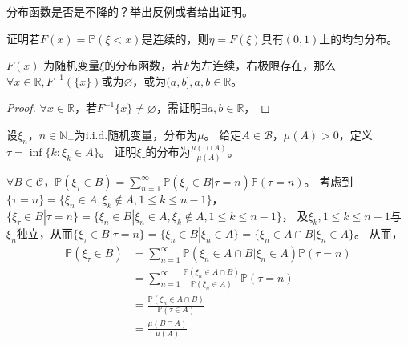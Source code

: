 \documentclass{ctexart}
\newif\ifpreface
\begin{document}
\large
\setlength{\baselineskip}{1.2em}
\ifpreface

\newgeometry{left=2cm,right=2cm,top=2cm,bottom=2cm}
\else
{}
\maketitle
\fi
\begin{problem}\label{pro:5}
  分布函数是否是不降的？举出反例或者给出证明。
\end{problem}

\begin{problem}\label{pro:7}
  证明若\(F(x)=\mathbb{P}(\xi < x) \)是连续的，则\(\eta = F(\xi) \)具有\((0,1) \)上的均匀分布。
\end{problem}
\begin{solution}
 \begin{lemma}\label{lem:pro7}
   \(F(x) \) 为随机变量\(\xi \)的分布函数，若\(F \)为左连续，右极限存在，那么\(\forall x \in \mathbb{R}, F^{-1}(\{x\}) \)或为\(\varnothing \)，或为\((a,b],a,b \in \mathbb{R} \)。
 \end{lemma}
\begin{proof}
 \(\forall x \in \mathbb{R} \)，若\(F^{-1}\{x\} \neq \varnothing\)，需证明\(\exists a, b \in \mathbb{R} \)， 
\end{proof}
  
\end{solution}

\begin{problem}\label{pro:9}
  设\(\xi_n，n \in \mathbb{N}_{+} \)为\(\mathrm{i.i.d.}  \)随机变量，分布为\(\mu \)。
  给定\(A \in \mathcal{B} \)，\(\mu(A) >0 \)，定义\(\tau = \inf\{k:\xi_k \in A\} \)。
  证明\(\xi_{\tau} \)的分布为\(\frac{\mu(\cdot \cap A)}{\mu(A)} \)。
\end{problem}
\begin{solution}
  \(\forall B \in \mathcal{C} \)，\(\mathbb{P}(\xi_{\tau} \in B)=\sum_{n=1}^{\infty} \mathbb{P}(\xi_{\tau} \in B | \tau =n)\mathbb{P}(\tau =n) \)。 
  考虑到\(\{\tau = n\} = \{\xi_n \in A, \xi_k \notin A, 1 \leq k \leq n-1\} \)， \(\{\xi_{\tau} \in B | \tau =n\}=\{\xi_n \in B | \xi_n \in A, \xi_k \notin A, 1 \leq k \leq n-1\}\)，
  及\(\xi_k, 1 \leq k \leq n-1 \)与\(\xi_n \)独立，从而\(\{\xi_{\tau} \in B| \tau =n\} = \{\xi_n \in B | \xi_n \in A\}=\{\xi_n \in A \cap B | \xi_n \in A\} \)。
  从而，\[
    \begin{aligned}
      \mathbb{P}(\xi_{\tau} \in B) &= \sum_{n=1}^{\infty}\mathbb{P}(\xi_n \in A \cap B | \xi_n \in A)\mathbb{P}(\tau =n)\\
      &=\sum_{n=1}^{\infty}\frac{\mathbb{P}(\xi_n \in A \cap B)}{\mathbb{P}(\xi_n \in A)}\mathbb{P}(\tau =n) \\ 
      &=\frac{\mathbb{P}(\xi_n \in A \cap B)}{\mathbb{P}(\tau \in A)}\\ 
      &=\frac{\mu(B \cap A)}{\mu(A)}
    \end{aligned}
  \]
\end{solution}
\end{document}
